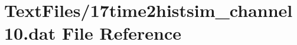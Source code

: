 \hypertarget{17time2histsim__channel10_8dat}{}\section{Text\+Files/17time2histsim\+\_\+channel10.dat File Reference}
\label{17time2histsim__channel10_8dat}
